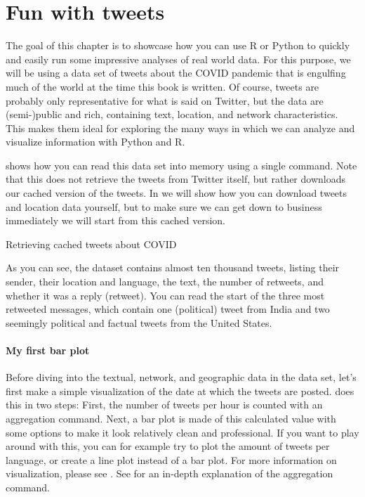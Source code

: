 \section{Fun with tweets}

The goal of this chapter is to showcase how you can use R or Python to quickly and easily
run some impressive analyses of real world data.
For this purpose, we will be using a data set of tweets about the COVID pandemic that is
engulfing much of the world at the time this book is written.
Of course, tweets are probably only representative for what is said on Twitter,
but the data are (semi-)public and rich, containing text, location, and network characteristics.
This makes them ideal for exploring the many ways in which we can analyze and visualize information
with Python and R. 

 shows how you can read this data set into memory using a single command.
Note that this does not retrieve the tweets from Twitter itself, but rather downloads
our cached version of the tweets.
In  we will show how you can download tweets and location data yourself, but to make sure
we can get down to business immediately we will start from this cached version. 

\begin{ccsexample}
\caption{Retrieving cached tweets about COVID}\label{ex:funtweets}
\end{ccsexample}

As you can see, the dataset contains almost ten thousand tweets, listing their
sender, their location and language, the text, the number of retweets, and whether it was a reply (retweet).
You can read the start of the three most retweeted messages, which contain one (political) tweet from India
and two seemingly political and factual tweets from the United States.

\paragraph{My first bar plot} Before diving into the textual, network, and geographic data in the data set,
let's first make a simple visualization of the date at which the tweets are posted.
 does this in two steps:
First, the number of tweets per hour is counted with an aggregation command.
Next, a bar plot is made of this calculated value with some options to make it look relatively clean and professional.
If you want to play around with this, you can for example try to plot the amount of tweets per language,
or create a line plot instead of a bar plot. 
For more information on visualization, please see .
See  for an in-depth explanation of the aggregation command. 

